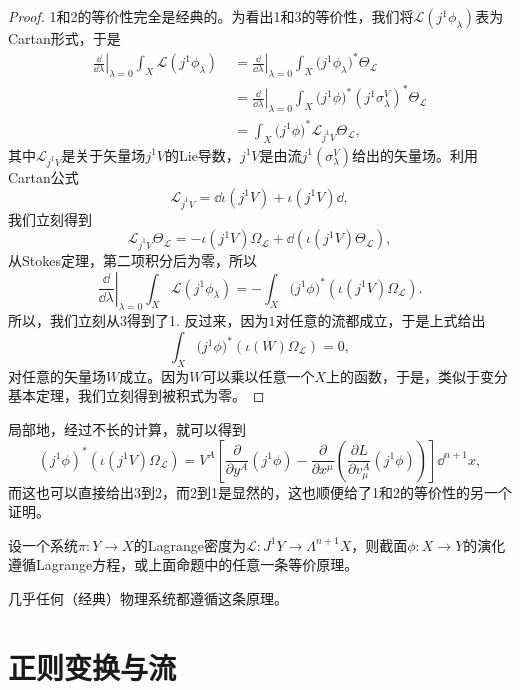 \begin{proof}
    1和2的等价性完全是经典的。为看出1和3的等价性，我们将$\mathcal L(j^1\phi_\lambda)$表为Cartan形式，于是
    \begin{align*}
        \left.\frac{\dd}{\dd \lambda}\right|_{\lambda=0}\int_X \mathcal L(j^1\phi_\lambda)\;&=\left.\frac{\dd}{\dd \lambda}\right|_{\lambda=0}\int_X \mathcal (j^1\phi_\lambda)^*\Theta_{\mathcal L}
        \\&=\left.\frac{\dd}{\dd \lambda}\right|_{\lambda=0}\int_X \mathcal (j^1\phi)^*(j^1\sigma^V_\lambda)^*\Theta_{\mathcal L}\\
        &=\int_X \mathcal (j^1\phi)^*\mathscr L_{j^1V}\Theta_{\mathcal L},
    \end{align*}
    其中$\mathscr L_{j^1V}$是关于矢量场$j^1V$的Lie导数，$j^1V$是由流$j^1(\sigma_\lambda^V)$给出的矢量场。利用Cartan公式
    \[
        \mathscr L_{j^1V}=\dd \iota(j^1V)+\iota(j^1V)\dd,
    \]
    我们立刻得到
    \[
        \mathscr L_{j^1V}\Theta_{\mathcal L}=-\iota(j^1V)\Omega_{\mathcal L}+\dd\left(\iota(j^1V) \Theta_{\mathcal L}\right),
    \]
    从Stokes定理，第二项积分后为零，所以
    \[
        \left.\frac{\dd}{\dd \lambda}\right|_{\lambda=0}\int_X \mathcal L(j^1\phi_\lambda)=-\int_X \mathcal (j^1\phi)^*(\iota(j^1V)\Omega_{\mathcal L}).
    \]
    所以，我们立刻从3得到了1. 反过来，因为$1$对任意的流都成立，于是上式给出
    \[
        \int_X \mathcal (j^1\phi)^*(\iota(W)\Omega_{\mathcal L})=0,
    \]
    对任意的矢量场$W$成立。因为$W$可以乘以任意一个$X$上的函数，于是，类似于变分基本定理，我们立刻得到被积式为零。
\end{proof}

局部地，经过不长的计算，就可以得到
\[
    (j^1\phi)^*(\iota(j^1V)\Omega_{\mathcal L})=V^A\left[\frac{\partial}{\partial y^A}(j^1\phi)-\frac{\partial}{\partial x^\mu}\left(\frac{\partial L}{\partial v^A_\mu}(j^1\phi)\right)\right]\dd^{n+1}x,
\]
而这也可以直接给出3到2，而2到1是显然的，这也顺便给了1和2的等价性的另一个证明。

\begin{para}[动力学原理]
    设一个系统$\pi:Y\to X$的Lagrange密度为$\mathcal{L}:J^1Y\to \Lambda^{n+1}X$，则截面$\phi:X\to Y$的演化遵循Lagrange方程，或上面命题中的任意一条等价原理。
\end{para}

几乎任何（经典）物理系统都遵循这条原理。

\section{正则变换与流}

